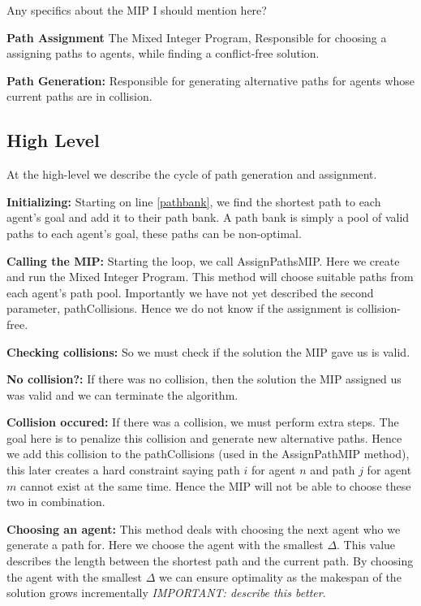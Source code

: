 \documentclass[a4paper,11pt]{article}
\begin{document}
Any specifics about the MIP I should mention here? 

\begin{compactenum}
	\item \textbf{Path Assignment} The Mixed Integer Program, Responsible for choosing a assigning paths to agents, while finding a conflict-free solution.
	\item \textbf{Path Generation:} Responsible for generating alternative paths for agents whose current paths are in collision.
\end{compactenum}

\subsection{High Level} \label{sec:high-level}
At the high-level we describe the cycle of path generation and assignment. 

\noindent \textbf{Initializing:} Starting on line \ref{pathbank}, we find the shortest path to each agent's goal and add it to their path bank. A path bank is simply a pool of valid paths to each agent's goal, these paths can be non-optimal.

\noindent \textbf{Calling the MIP:} Starting the loop, we call AssignPathsMIP. Here we create and run the Mixed Integer Program. This method will choose suitable paths from each agent's path pool. Importantly we have not yet described the second parameter, pathCollisions. Hence we do not know if the assignment is collision-free. 

\noindent \textbf{Checking collisions:} So we must check if the solution the MIP gave us is valid.

\noindent \textbf{No collision?:} If there was no collision, then the solution the MIP assigned us was valid and we can terminate the algorithm.

\noindent \textbf{Collision occured:} If there was a collision, we must perform extra steps. The goal here is to penalize this collision and generate new alternative paths. Hence we add this collision to the pathCollisions (used in the AssignPathMIP method), this later creates a hard constraint saying path $i$ for agent $n$ and path $j$ for agent $m$ cannot exist at the same time. Hence the MIP will not be able to choose these two in combination.

\noindent \textbf{Choosing an agent:} This method deals with choosing the next agent who we generate a path for. Here we choose the agent with the smallest $\Delta$. This value describes the length between the shortest path and the current path. By choosing the agent with the smallest $\Delta$ we can ensure optimality as the makespan of the solution grows incrementally \textit{IMPORTANT: describe this better}.
\end{document}
